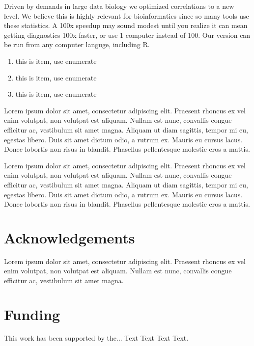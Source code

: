 \documentclass{bioinfo}
\begin{document}
Driven by demands in large data biology we optimized correlations to
a new level. We believe this is highly relevant for bioinformatics
since so many tools use these statistics. A 100x speedup may sound
modest until you realize it can mean getting diagnostics 100x
faster, or use 1 computer instead of 100. Our version can be run
from any computer languge, including R.


\begin{enumerate}
\item this is item, use enumerate
\item this is item, use enumerate
\item this is item, use enumerate
\end{enumerate}

Lorem ipsum dolor sit amet, consectetur adipiscing elit. Praesent 
rhoncus ex vel enim volutpat, non volutpat est aliquam. Nullam est 
nunc, convallis congue efficitur ac, vestibulum sit amet magna. 
Aliquam ut diam sagittis, tempor mi eu, egestas libero. Duis sit 
amet dictum odio, a rutrum ex. Mauris eu cursus lacus. Donec 
lobortis non risus in blandit. Phasellus pellentesque molestie 
eros a mattis. 


Lorem ipsum dolor sit amet, consectetur adipiscing elit. Praesent 
rhoncus ex vel enim volutpat, non volutpat est aliquam. Nullam est 
nunc, convallis congue efficitur ac, vestibulum sit amet magna. 
Aliquam ut diam sagittis, tempor mi eu, egestas libero. Duis sit 
amet dictum odio, a rutrum ex. Mauris eu cursus lacus. Donec 
lobortis non risus in blandit. Phasellus pellentesque molestie 
eros a mattis. 


\section*{Acknowledgements}

Lorem ipsum dolor sit amet, consectetur adipiscing elit. Praesent 
rhoncus ex vel enim volutpat, non volutpat est aliquam. Nullam est 
nunc, convallis congue efficitur ac, vestibulum sit amet magna.
\vspace*{-12pt}

\section*{Funding}

This work has been supported by the... Text Text  Text Text.\vspace*{-12pt}


%
%
%
%
%
%
%

\end{document}
